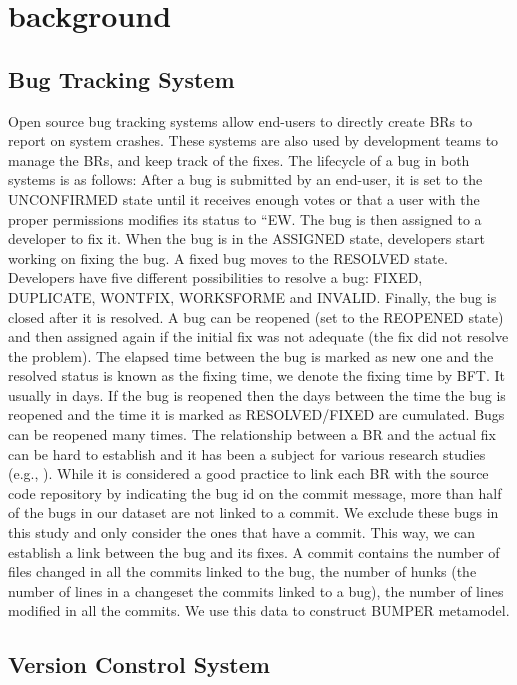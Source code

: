 \documentclass[conference]{IEEEtran}
\begin{document}
\section{background}
\label{sec:background}

\subsection{Bug Tracking System}
\label{sub:bug-tracking-system}

Open source bug tracking systems allow end-users to directly create BRs to report on system crashes.
These systems are also used by development teams to manage the BRs, and keep track of the fixes.
The lifecycle of a bug in both systems is as follows: After a bug is submitted by an end-user, it is set to the UNCONFIRMED state until it receives enough votes or that a user with the proper permissions modifies its status to “EW.
The bug is then assigned to a developer to fix it.
When the bug is in the ASSIGNED state, developers start working on fixing the bug.
A fixed bug moves to the RESOLVED state.
Developers have five different possibilities to resolve a bug: FIXED, DUPLICATE, WONTFIX, WORKSFORME and INVALID.
Finally, the bug is closed after it is resolved.
A bug can be reopened (set to the REOPENED state) and then assigned again if the initial fix was not adequate (the fix did not resolve the problem).
The elapsed time between the bug is marked as new one and the resolved status is known as the fixing time, we denote the fixing time by BFT.
It usually in days.
If the bug is reopened then the days between the time the bug is reopened and the time it is marked as RESOLVED/FIXED are cumulated.
Bugs can be reopened many times.
The relationship between a BR and the actual fix can be hard to establish and it has been a subject for various research studies (e.g., \cite{Wu2011}\cite{Antoniol2002}).
While it is considered a good practice to link each BR with the source code repository by indicating the bug id on the commit message, more than half of the bugs in our dataset are not linked to a commit.
We exclude these bugs in this study and only consider the ones that have a commit.
This way, we can establish a link between the bug and its fixes.
A commit contains the number of files changed in all the commits linked to the bug, the number of hunks (the number of lines in a changeset the commits linked to a bug), the number of lines modified in all the commits.
We use this data to construct BUMPER metamodel.


\subsection{Version Constrol System}
\label{sub:Version Constrol System}
\end{document}
